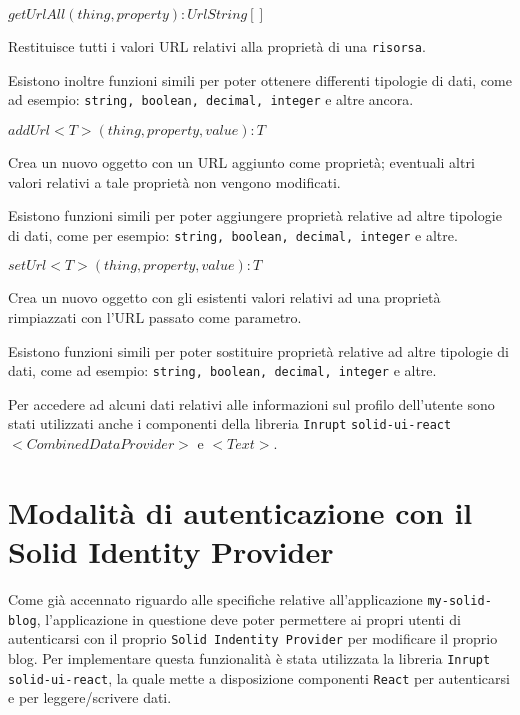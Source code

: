 \bigskip
\medskip

$getUrlAll(thing, property): UrlString[]$

\bigskip

Restituisce tutti i valori URL relativi alla proprietà di una {\tt risorsa}.

\bigskip

Esistono inoltre funzioni simili per poter ottenere differenti tipologie di dati, come ad esempio: {\tt string, boolean, decimal, integer} e altre ancora.

\medskip
\bigskip 

$addUrl<T>(thing, property, value): T$

\bigskip

Crea un nuovo oggetto con un URL aggiunto come proprietà; eventuali altri valori relativi a tale proprietà non vengono modificati.

\bigskip

Esistono funzioni simili per poter aggiungere proprietà relative ad altre tipologie di dati, come per esempio: {\tt string, boolean, decimal, integer} e altre.

\medskip
\bigskip

$setUrl<T>(thing, property, value): T$

\bigskip

Crea un nuovo oggetto con gli esistenti valori relativi ad una proprietà rimpiazzati con l'URL passato come parametro.

\bigskip

Esistono funzioni simili per poter sostituire proprietà relative ad altre tipologie di dati, come ad esempio: {\tt string, boolean, decimal, integer} e altre.

\bigskip
\medskip

Per accedere ad alcuni dati relativi alle informazioni sul profilo dell'utente sono stati utilizzati anche i componenti della libreria {\tt Inrupt} {\tt solid-ui-react} $<CombinedDataProvider>$ e $<Text>$.

\bigskip

\section{Modalità di autenticazione con il Solid Identity Provider}

\medskip

Come già accennato riguardo alle specifiche relative all'applicazione {\tt my-solid-blog}, l'applicazione in questione deve poter permettere ai propri utenti di autenticarsi con il proprio {\tt Solid Indentity Provider} per modificare il proprio blog. Per implementare questa funzionalità è stata utilizzata la libreria {\tt Inrupt} {\tt solid-ui-react}, la quale mette a disposizione componenti {\tt React} per autenticarsi e per leggere/scrivere dati.

